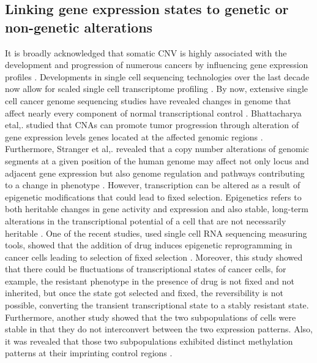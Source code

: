 \subsection{Linking gene expression states to genetic or non-genetic alterations}
It is broadly acknowledged that somatic CNV is highly associated with the development and progression of numerous cancers by influencing gene expression profiles \cite{yang2017prame, gut2018sox2}. 
Developments in single cell sequencing technologies over the last decade now allow for scaled single cell transcriptome profiling \cite{zahn2017scalable, zheng2017massively}.
By now, extensive single cell cancer genome sequencing studies have revealed changes in genome that affect nearly every component of normal transcriptional control \cite{garraway2013lessons}. 
Bhattacharya etal,. studied that CNAs can promote tumor progression through alteration of gene expression levels genes located at the affected genomic regions \cite{bhattacharya2020transcriptional, henrichsen2009segmental, tang2013gene}. Furthermore, Stranger et al,. revealed that a copy number alterations of genomic segments at a given position of the human genome may affect not only locus and adjacent gene expression but also genome regulation and pathways contributing to a change in phenotype \cite{stranger2007relative}. However, transcription can be altered as a result of epigenetic modifications that could lead to fixed selection. Epigenetics refers to both heritable changes in gene activity and expression and also stable, long-term alterations in the transcriptional potential of a cell that are not necessarily heritable \cite {aristizabal2020biological, nih2019overview}.
One of the recent studies, used single cell RNA sequencing measuring tools, showed that the addition of drug induces epigenetic reprogramming in cancer cells leading to selection of fixed selection \cite{shaffer2017rare}. Moreover, this study showed that there could be fluctuations of transcriptional states of cancer cells, for example, the resistant phenotype in the presence of drug is not fixed and not inherited, but once the state got selected and fixed, the reversibility is not possible, converting the transient transcriptional state to a stably resistant state. Furthermore, another study showed that the two subpopulations of cells were stable in that they do not interconvert between the two expression patterns. Also, it was revealed that those two subpopulations exhibited distinct methylation patterns at their imprinting control regions \cite{ginart2016visualizing}.


